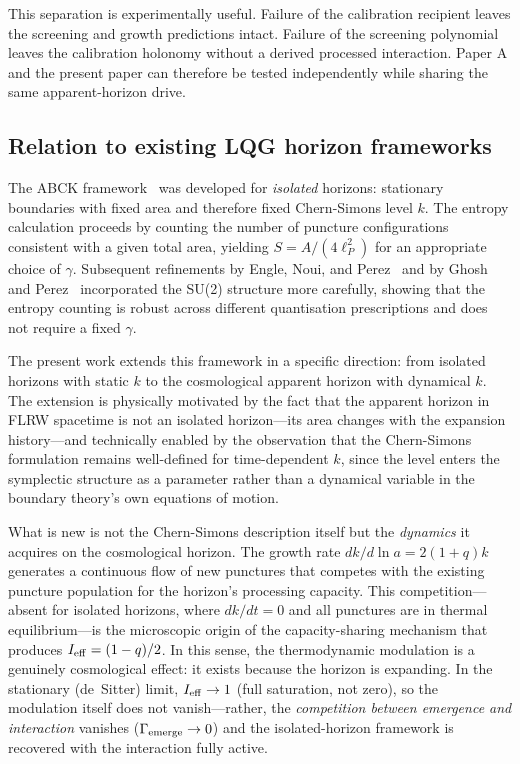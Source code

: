 \documentclass[aps,prd,twocolumn,10pt,superscriptaddress,nofootinbib]{revtex4-2}
\begin{document}
This separation is experimentally useful.  Failure of the calibration
recipient leaves the screening and growth predictions intact.  Failure of
the screening polynomial leaves the calibration holonomy without a derived
processed interaction.  Paper A and the present paper can therefore be
tested independently while sharing the same apparent-horizon drive.



\subsection{Relation to existing LQG horizon frameworks}
\label{sec:lqg_context}

The ABCK framework~\cite{Ashtekar1998,Ashtekar2000} was developed
for \emph{isolated} horizons: stationary boundaries with fixed
area and therefore fixed Chern-Simons level $k$.  The entropy
calculation proceeds by counting the number of puncture
configurations consistent with a given total area, yielding
$S = A/(4\ell_P^2)$ for an appropriate choice of $\gamma$.
Subsequent refinements by Engle, Noui, and
Perez~\cite{Engle2010} and by Ghosh and Perez~\cite{Ghosh2011}
incorporated the SU(2) structure more carefully, showing that
the entropy counting is robust across different quantisation
prescriptions and does not require a fixed $\gamma$.

The present work extends this framework in a specific direction:
from isolated horizons with static $k$ to the cosmological
apparent horizon with dynamical $k$.  The extension is physically
motivated by the fact that the apparent horizon in FLRW spacetime
is not an isolated horizon---its area changes with the expansion
history---and technically enabled by the observation that the
Chern-Simons formulation remains well-defined for time-dependent
$k$, since the level enters the symplectic structure as a
parameter rather than a dynamical variable in the boundary
theory's own equations of motion.

What is new is not the Chern-Simons description itself but
the \emph{dynamics} it acquires on the cosmological horizon.
The growth rate $dk/d\ln a = 2(1+q)k$ generates a continuous
flow of new punctures that competes with the existing puncture
population for the horizon's processing capacity.  This
competition---absent for isolated horizons, where $dk/dt = 0$
and all punctures are in thermal equilibrium---is the microscopic
origin of the capacity-sharing mechanism that produces
$I_{\rm eff} = (1-q)/2$.  In this sense, the thermodynamic
modulation is a genuinely cosmological effect: it exists because
the horizon is expanding.  In the stationary (de~Sitter) limit,
$I_{\rm eff} \to 1$ (full saturation, not zero), so the modulation
itself does not vanish---rather, the \emph{competition between
emergence and interaction} vanishes ($\Gamma_{\rm emerge} \to 0$)
and the isolated-horizon framework is recovered with the
interaction fully active.
\end{document}
